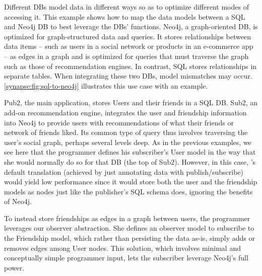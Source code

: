 Different DBs model data in different ways so as to optimize different modes of
accessing it. This example shows how to map the data models between a SQL and
Neo4j DB to best leverage the DBs' functions.  Neo4j, a graph-oriented DB, is
optimized for graph-structured data and queries. It stores relationships between
data items -- such as users in a social network or products in an e-commerce app
-- as edges in a graph and is optimized for queries that must traverse the graph
such as those of recommendation engines. In contrast, SQL stores relationships
in separate tables. When integrating these two DBs, model mismatches may occur.
\F\ref{synapse:fig:sql-to-neo4j} illustrates this use case with an example.

Pub2, the main application, stores Users and their friends in a SQL DB.
Sub2, an add-on recommendation engine, integrates the user and friendship
information into Neo4j to provide users with recommendations of what their
friends or network of friends liked. Its common type of query thus involves
traversing the user's social graph, perhaps several levels deep.  As in the
previous examples, we see here that the programmer defines his subscriber's User
model in the way that she would normally do so for that DB (the top of
Sub2).  However, in this case, \synapse's default translation (achieved by just
annotating data with publish/subscribe) would yield low performance since it
would store both the user and the friendship models as nodes just like the
publisher's SQL schema does, ignoring the benefits of Neo4j.

To instead store friendships as edges in a graph between users, the programmer
leverages our observer abstraction.  She defines an observer model to
subscribe to the Friendship model, which rather than persisting the data as-is,
simply adds or removes edges among User nodes.  This solution, which involves
minimal and conceptually simple programmer input, lets the subscriber
leverage Neo4j's full power.

